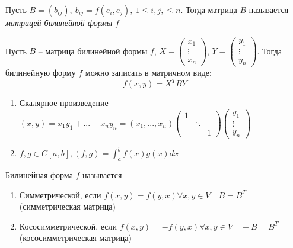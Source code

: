 \begin{Def} 
	Пусть $B = (b_{ij}), \ b_{ij} = f(e_i, e_j), \ 1 \leqslant i, j, \leqslant n$.
	Тогда матрица $B$ называется \textit{матрицей билинейной формы}  $f$
\end{Def} 

\begin{Rem}
	Пусть $B$ -- матрица билинейной формы $f$, 
	$X = \left(
		\begin{array}{c}	
		x_1\\
		\vdots\\
		x_n
	\end{array}\right)$, $Y = \left(
	\begin{array}{ccc}	
		y_1\\
		\vdots\\
		y_n
	\end{array}\right)$. Тогда билинейную форму $f$ можно записать в матричном виде:
	\[f(x, y) = X^T B Y\]
\end{Rem}

\begin{Example}
	\begin{enumerate}
		\item Скалярное произведение $(x, y) = x_1y_1 + ... + x_ny_n = (x_1, ..., x_n) \left(
			\begin{array}{ccc}	
				1 & &\\
				& \ddots &\\
				& & 1
			\end{array}\right) \left(
				\begin{array}{ccc}	
					y_1\\
					\vdots\\
					y_n
				\end{array}\right)$
		\item $f, g \in C[a,b], (f, g) = \int_{a}^{b} f(x)g(x)dx$
	\end{enumerate}	
\end{Example}

\begin{Def} 
	Билинейная форма $f$ называется
	\begin{enumerate}
		\item Симметрической, если $f(x,y) = f(y,x) \forall x, y \in V \quad B = B^T$ (симметрическая матрица)
		\item Кососимметрической, если $f(x, y) = -f (y,x) \forall x, y \in V \quad -B = B^T$ (кососимметрическая матрица)
	\end{enumerate}
\end{Def} 

